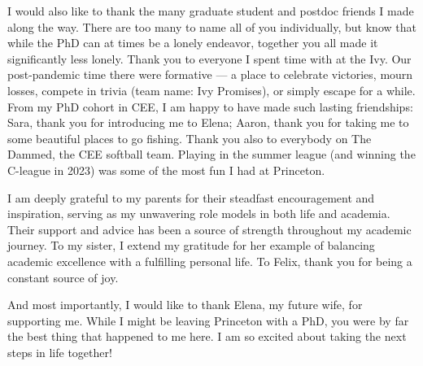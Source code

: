 {    I would also like to thank the many graduate student and postdoc friends I made along the way. There are too many to name all of you individually, but know that while the PhD can at times be a lonely endeavor, together you all made it significantly less lonely. Thank you to everyone I spent time with at the Ivy. Our post-pandemic time there were formative — a place to celebrate victories, mourn losses, compete in trivia (team name: Ivy Promises), or simply escape for a while. From my PhD cohort in CEE, I am happy to have made such lasting friendships: Sara, thank you for introducing me to Elena; Aaron, thank you for taking me to some beautiful places to go fishing. Thank you also to everybody on The Dammed, the CEE softball team. Playing in the summer league (and winning the C-league in 2023) was some of the most fun I had at Princeton.

    I am deeply grateful to my parents for their steadfast encouragement and inspiration, serving as my unwavering role models in both life and academia. Their support and advice has been a source of strength throughout my academic journey. To my sister, I extend my gratitude for her example of balancing academic excellence with a fulfilling personal life. To Felix, thank you for being a constant source of joy.

    And most importantly, I would like to thank Elena, my future wife, for supporting me. While I might be leaving Princeton with a PhD, you were by far the best thing that happened to me here. I am so excited about taking the next steps in life together!
}